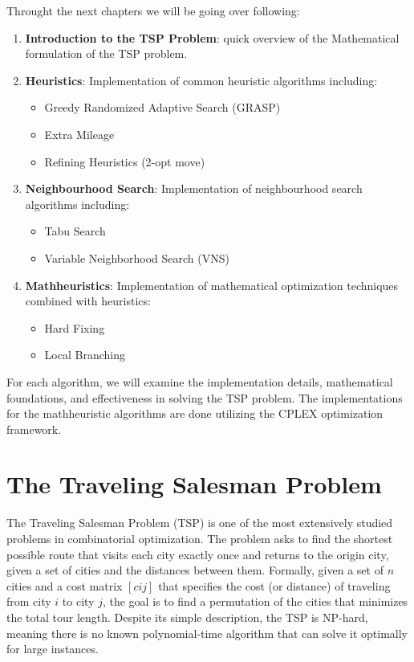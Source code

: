 \documentclass{article}
\begin{document}
Throught the next chapters we will be going over following:
\begin{enumerate}
	\item \textbf{Introduction to the TSP Problem}: quick overview of the Mathematical formulation of the TSP problem.
	\item \textbf{Heuristics}: Implementation of common heuristic algorithms including:
		\begin{itemize}
			\item Greedy Randomized Adaptive Search (GRASP)
			\item Extra Mileage
			\item Refining Heuristics (2-opt move)
		\end{itemize}
	\item \textbf{Neighbourhood Search}: Implementation of neighbourhood search algorithms including:
		\begin{itemize}
			\item Tabu Search
			\item Variable Neighborhood Search (VNS)
		\end{itemize}
	\item \textbf{Mathheuristics}: Implementation of mathematical optimization techniques combined with heuristics:
		\begin{itemize}
			\item Hard Fixing
			\item Local Branching
		\end{itemize}
\end{enumerate}

For each algorithm, we will examine the implementation details, mathematical foundations, and effectiveness in solving the TSP problem. 
The implementations for the mathheuristic algorithms are done utilizing the CPLEX optimization framework. 

\newpage

\section{The Traveling Salesman Problem}
The Traveling Salesman Problem (TSP) is one of the most extensively studied problems in combinatorial optimization. The problem asks to find the shortest possible route that visits each city exactly once and returns to the origin city, 
given a set of cities and the distances between them.
Formally, given a set of $n$ cities and a cost matrix $[cij]$ that specifies the cost (or distance) of traveling from city $i$ to city $j$, the goal is to find a permutation of the cities that minimizes the total tour length. 
Despite its simple description, the TSP is NP-hard, meaning there is no known polynomial-time algorithm that can solve it optimally for large instances.
\end{document}
